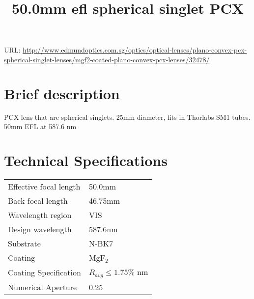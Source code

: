 \documentclass{article}
\title{\vspace{-4cm}50.0mm efl spherical singlet PCX}
\date{}
\begin{document}
\maketitle

\vspace{-1cm}

URL: \url{http://www.edmundoptics.com.sg/optics/optical-lenses/plano-convex-pcx-spherical-singlet-lenses/mgf2-coated-plano-convex-pcx-lenses/32478/}

\begin{multicols}{2}

\section{Brief description}

PCX lens that are spherical singlets. 25mm diameter, fits in Thorlabs SM1 tubes. 50mm EFL at 587.6 nm



\section{Technical Specifications}


\begin{tabular}{|l|l|}
  Effective focal length & 50.0mm \\
  Back focal length & 46.75mm\\
  Wavelength region & VIS \\
  Design wavelength & 587.6nm \\
  Substrate & N-BK7 \\
  Coating & MgF$_{2}$ \\
  Coating Specification & $R_{avg} \leq 1.75\%$ nm \\
  Numerical Aperture & 0.25 \\
\end{tabular}%


\end{multicols}
\end{document}
